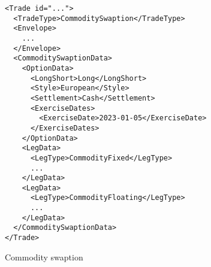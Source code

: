 \begin{listing}[h!]
\begin{verbatim}
<Trade id="...">
  <TradeType>CommoditySwaption</TradeType>
  <Envelope>
    ...
  </Envelope>
  <CommoditySwaptionData>
    <OptionData>
      <LongShort>Long</LongShort>
      <Style>European</Style>
      <Settlement>Cash</Settlement>
      <ExerciseDates>
        <ExerciseDate>2023-01-05</ExerciseDate>
      </ExerciseDates>
    </OptionData>
    <LegData>
      <LegType>CommodityFixed</LegType>
      ...
    </LegData>
    <LegData>
      <LegType>CommodityFloating</LegType>
      ...
    </LegData>
  </CommoditySwaptionData>
</Trade>
\end{verbatim}
\caption{Commodity swaption}
\label{lst:commodity_swaption}
\end{listing}
